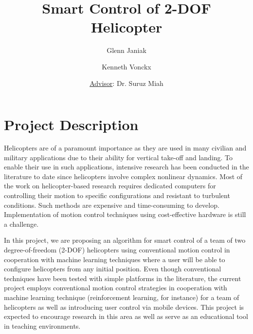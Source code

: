 \documentclass[12pt]{article} %
\title{Smart Control of 2-DOF Helicopter}
\author{Glenn Janiak \and Kenneth Vonckx \and \underline{Advisor}: Dr. Suruz Miah
}
\begin{document}
\maketitle

\section{Project Description}

Helicopters are of a paramount importance as they are used in many civilian and military applications due to their ability for vertical take-off and landing.  To enable their use in such applications, intensive research has been conducted in the literature to date since helicopters involve complex nonlinear dynamics.  Most of the work on helicopter-based research requires dedicated computers for controlling their motion to specific configurations and resistant to turbulent conditions.  Such methods are expensive and time-consuming to develop.  Implementation of motion control techniques using cost-effective hardware is still a challenge.


In this project, we are proposing an algorithm for smart control of a team of two degree-of-freedom (2-DOF) helicopters using conventional motion control in cooperation with machine learning techniques where a user will be able to configure helicopters from any initial position.  Even though conventional techniques have been tested with simple platforms in the literature, the current project employs conventional motion control strategies in cooperation with machine learning technique (reinforcement learning, for instance) for a team of helicopters as well as introducing user control via mobile devices.  This project is expected to encourage research in this area as well as serve as an educational tool in teaching environments.   

\end{document}
